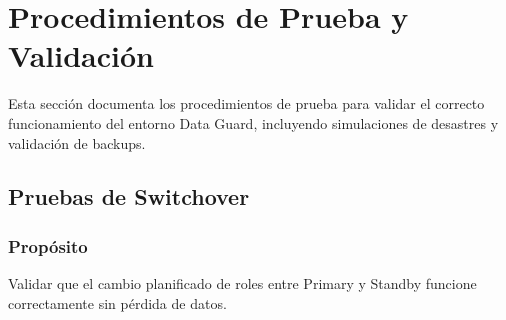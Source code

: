 \documentclass[11pt, a4paper]{report}
\begin{document}
\newpage

\chapter{Procedimientos de Prueba y Validación}

Esta sección documenta los procedimientos de prueba para validar el correcto funcionamiento del entorno Data Guard, incluyendo simulaciones de desastres y validación de backups.

\section{Pruebas de Switchover}

\subsection{Propósito}
Validar que el cambio planificado de roles entre Primary y Standby funcione correctamente sin pérdida de datos.
\end{document}
